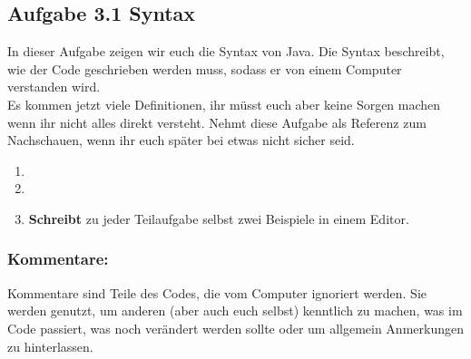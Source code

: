 \subsection*{Aufgabe 3.1 Syntax}
\noindent
In dieser Aufgabe zeigen wir euch die Syntax von Java.
Die Syntax beschreibt, wie der Code geschrieben werden muss, sodass er von einem Computer verstanden wird.\\
Es kommen jetzt viele Definitionen, ihr müsst euch aber keine Sorgen machen wenn ihr nicht alles direkt versteht.
Nehmt diese Aufgabe als Referenz zum Nachschauen, wenn ihr euch später bei etwas nicht sicher seid.
\begin{enumerate}
	\item {}
	\item {}
	\item \textbf{Schreibt} zu jeder Teilaufgabe selbst zwei Beispiele in einem Editor. 
\end{enumerate}

\begin{Infobox}
	
	\subsubsection*{Kommentare:}
	Kommentare sind Teile des Codes, die vom Computer ignoriert werden.
	Sie werden genutzt, um anderen (aber auch euch selbst) kenntlich zu machen, was im Code passiert, was noch verändert werden sollte oder um allgemein Anmerkungen zu hinterlassen.
\end{Infobox}

